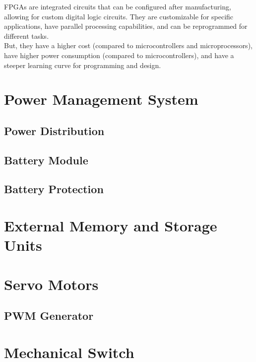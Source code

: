 \glspl{FPGA} are integrated circuits that can be configured after manufacturing, allowing for custom digital logic circuits. 
They are customizable for specific applications, have parallel processing capabilities, and can be reprogrammed for different tasks.\\
But, they have a higher cost (compared to microcontrollers and microprocessors), have higher power consumption (compared to microcontrollers), and have a steeper learning curve for programming and design.\\

\section{Power Management System}
\subsection{Power Distribution}
\subsection{Battery Module}
\subsection{Battery Protection}

\section{External Memory and Storage Units}

\section{Servo Motors}
\subsection{PWM Generator}

\section{Mechanical Switch}

